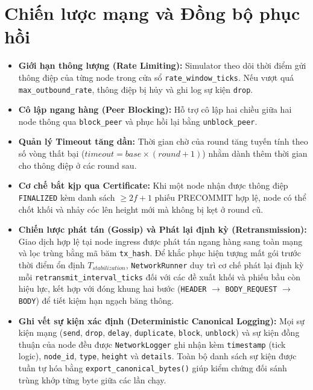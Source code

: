 \documentclass[10pt,a4paper]{report}
\begin{document}
\section{Chiến lược mạng và Đồng bộ phục hồi}
\begin{itemize}
  \item \textbf{Giới hạn thông lượng (Rate Limiting):} Simulator theo dõi thời điểm gửi thông điệp của từng node trong cửa sổ \texttt{rate\_window\_ticks}. Nếu vượt quá \texttt{max\_outbound\_rate}, thông điệp bị hủy và ghi log sự kiện \texttt{drop}.
  \item \textbf{Cô lập ngang hàng (Peer Blocking):} Hỗ trợ cô lập hai chiều giữa hai node thông qua \texttt{block\_peer} và phục hồi lại bằng \texttt{unblock\_peer}.
  \item \textbf{Quản lý Timeout tăng dần:} Thời gian chờ của round tăng tuyến tính theo số vòng thất bại ($timeout = base \times (round + 1)$) nhằm dành thêm thời gian cho thông điệp ở các round sau.
  \item \textbf{Cơ chế bắt kịp qua Certificate:} Khi một node nhận được thông điệp \texttt{FINALIZED} kèm danh sách $\ge 2f + 1$ phiếu PRECOMMIT hợp lệ, node có thể chốt khối và nhảy cóc lên height mới mà không bị kẹt ở round cũ.
  \item \textbf{Chiến lược phát tán (Gossip) và Phát lại định kỳ (Retransmission):} Giao dịch hợp lệ tại node ingress được phát tán ngang hàng sang toàn mạng và lọc trùng bằng mã băm \texttt{tx\_hash}. Để khắc phục hiện tượng mất gói trước thời điểm ổn định $T_{stabilization}$, \texttt{NetworkRunner} duy trì cơ chế phát lại định kỳ mỗi \texttt{retransmit\_interval\_ticks} đối với các đề xuất khối và phiếu bầu còn hiệu lực, kết hợp với đóng khung hai bước (\texttt{HEADER} $\rightarrow$ \texttt{BODY\_REQUEST} $\rightarrow$ \texttt{BODY}) để tiết kiệm hạn ngạch băng thông.
  \item \textbf{Ghi vết sự kiện xác định (Deterministic Canonical Logging):} Mọi sự kiện mạng (\texttt{send}, \texttt{drop}, \texttt{delay}, \texttt{duplicate}, \texttt{block}, \texttt{unblock}) và sự kiện đồng thuận của node đều được \texttt{NetworkLogger} ghi nhận kèm \texttt{timestamp} (tick logic), \texttt{node\_id}, \texttt{type}, \texttt{height} và \texttt{details}. Toàn bộ danh sách sự kiện được tuần tự hóa bằng \texttt{export\_canonical\_bytes()} giúp kiểm chứng đối sánh trùng khớp từng byte giữa các lần chạy.
\end{itemize}
\end{document}
